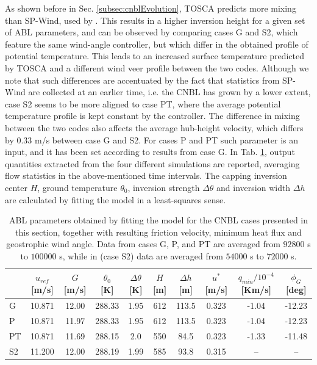 \documentclass[journal abbreviation, manuscript]{copernicus}
\begin{document}
As shown before in Sec. \ref{subsec:cnblEvolution}, TOSCA predicts more mixing than SP-Wind, used by \cite{2017a_AllaertsMeyers}. This results in a higher inversion height for a given set of ABL parameters, and can be observed by comparing cases G and S2, which feature the same wind-angle controller, but which differ in the obtained profile of potential temperature. This leads to an increased surface temperature predicted by TOSCA and a different wind veer profile between the two codes. Although we note that such differences are accentuated by the fact that statistics from SP-Wind are collected at an earlier time, i.e. the CNBL has grown by a lower extent, case S2 seems to be more aligned to case PT, where the average potential temperature profile is kept constant by the controller. The difference in mixing between the two codes also affects the average hub-height velocity, which differs by 0.33 m/s between case G and S2. For cases P and PT such parameter is an input, and it has been set according to results from case G. In Tab. \ref{tab:cnblComparison_1}, output quantities extracted from the four different simulations are reported, averaging flow statistics in the above-mentioned time intervals. The capping inversion center $H$, ground temperature $\theta_0$, inversion strength $\Delta\theta$ and inversion width $\Delta h$ are calculated by fitting the \cite{2004_RampanelliZardi} model in a least-squares sense. 
\begin{table}[H]
	\begin{center}
		\begin{tabular}{l c c c c c c c c c} 
			\hline
			& $u_{ref}$ [m/s] & $G$ [m/s] & $\theta_0$ [K]& $\Delta\theta$ [K] & $H$ [m] & $\Delta h$ [m]& $u^*$ [m/s]& $q_{min}/10^{-4}$ [Km/s] & $\phi_G$ [deg]\\
			\hline
			G & 10.871 & 12.00 & 288.33 & 1.95 & 612 & 113.5 & 0.323 &  -1.04 & -12.23\\
			P & 10.871 & 11.97 & 288.33 & 1.95 & 612 & 113.5 & 0.323 &  -1.04 & -12.23\\
			PT & 10.871 & 11.69 & 288.15 & 2.0 & 550 & 84.5 & 0.323 &  -1.33 & -11.48\\
			S2 & 11.200 & 12.00 & 288.19 & 1.99 & 585 & 93.8 & 0.315 &  -- & --\\
			\hline
		\end{tabular}
	\end{center}
	\caption{ABL parameters obtained by fitting the \cite{2004_RampanelliZardi} model for the CNBL cases presented in this section, together with resulting friction velocity, minimum heat flux and geostrophic wind angle. Data from cases G, P, and PT are averaged from $92800$ s to $100000$ s, while in \cite{2017a_AllaertsMeyers} (case S2) data are averaged from $54000$ s to $72000$ s. }
	\label{tab:cnblComparison_1}
\end{table}
\end{document}

